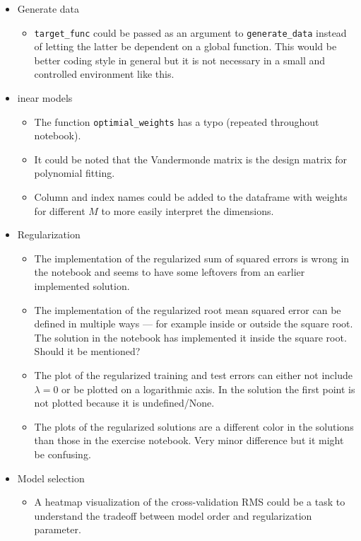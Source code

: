 \documentclass{article}
\begin{document}
\begin{itemize}
    \item Generate data
    \begin{itemize}
        \item \texttt{target\_func} could be passed as an argument to \texttt{generate\_data} instead of letting the latter be dependent on a global function. This would be better coding style in general but it is not necessary in a small and controlled environment like this.
    \end{itemize}

    \item[1] inear models
    \begin{itemize}
        \item[1.4] The function \texttt{optimial\_weights} has a typo (repeated throughout notebook).
        \item[1.4] It could be noted that the Vandermonde matrix is the design matrix for polynomial fitting.
        \item[1.5] Column and index names could be added to the dataframe with weights for different $M$ to more easily interpret the dimensions.
    \end{itemize}

    \item[2] Regularization
    \begin{itemize}
        \item[2.1] The implementation of the regularized sum of squared errors is wrong in the notebook and seems to have some leftovers from an earlier implemented solution.
        \item[2.1] The implementation of the regularized root mean squared error can be defined in multiple ways --- for example inside or outside the square root. The solution in the notebook has implemented it inside the square root. Should it be mentioned?
        \item[2.3] The plot of the regularized training and test errors can either not include $\lambda = 0$ or be plotted on a logarithmic axis. In the solution the first point is not plotted because it is undefined/None.
        \item[2.3] The plots of the regularized solutions are a different color in the solutions than those in the exercise notebook. Very minor difference but it might be confusing.
    \end{itemize}

    \item[3] Model selection
    \begin{itemize}
        \item[3.1] A heatmap visualization of the cross-validation RMS could be a task to understand the tradeoff between model order and regularization parameter.
    \end{itemize}


\end{itemize}
\end{document}
